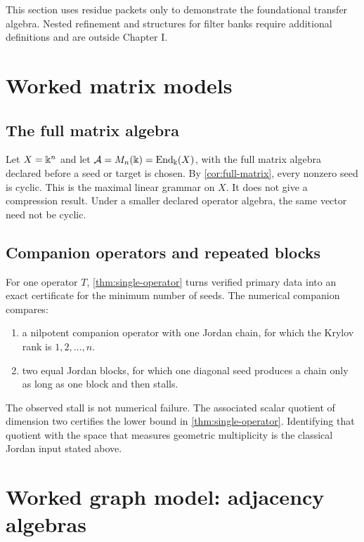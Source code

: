 \begin{boundary}
This section uses residue packets only to demonstrate the foundational transfer algebra. Nested refinement and structures for filter banks require additional definitions and are outside Chapter I.
\end{boundary}

\section{Worked matrix models}

\subsection{The full matrix algebra}

Let $X=\Bbbk^n$ and let $\mathcal A=M_n(\Bbbk)=\operatorname{End}_{\Bbbk}(X)$, with the full matrix algebra declared before a seed or target is chosen. By \cref{cor:full-matrix}, every nonzero seed is cyclic. This is the maximal linear grammar on $X$. It does not give a compression result. Under a smaller declared operator algebra, the same vector need not be cyclic.

\subsection{Companion operators and repeated blocks}

For one operator $T$, \cref{thm:single-operator} turns verified primary data
into an exact certificate for the minimum number of seeds.  The numerical companion compares:
\begin{enumerate}[label=(\alph*)]
\item a nilpotent companion operator with one Jordan chain, for which the Krylov rank is $1,2,\ldots,n$.
\item two equal Jordan blocks, for which one diagonal seed produces a chain only as long as one block and then stalls.
\end{enumerate}

The observed stall is not numerical failure.  The associated
scalar quotient of dimension two certifies the lower bound in
\cref{thm:single-operator}. Identifying that quotient with the space that
measures geometric multiplicity is the classical Jordan input stated above.

\section{Worked graph model: adjacency algebras}

